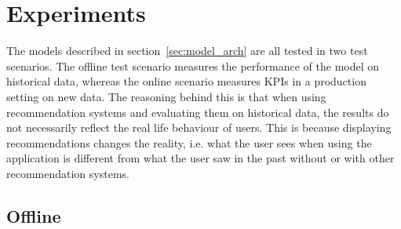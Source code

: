 \chapter{Experiments}
The models described in section~\ref{sec:model_arch} are all tested in two test scenarios.
The offline test scenario measures the performance of the model on historical data, whereas the online scenario measures KPIs in a production setting on new data.
The reasoning behind this is that when using recommendation systems and evaluating them on historical data, the results do not necessarily reflect the real life behaviour of users.
This is because displaying recommendations changes the reality, i.e. what the user sees when using the application is different from what the user saw in the past without or with other recommendation systems.
\section{Offline}
